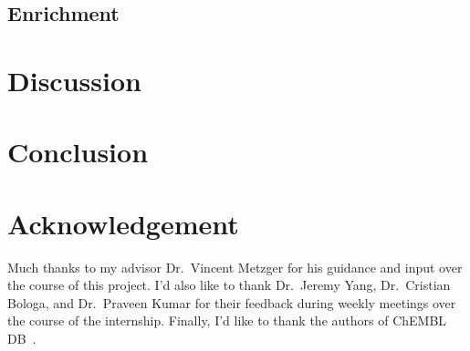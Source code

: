 \documentclass[11pt]{article}
\begin{document}
\begin{table}[!ht]
\centering
{}
\caption{Table showing comparisons of targets, ligands, and ligand similarity distributions per kinase group. Shown p-values are calculated (with Bonferroni correction) from a MWUT where the alternative hypothesis is that the similarity values within the group are stochastically greater than the distribution of all similarity values.}\label{results_table}
\end{table}



\subsection*{Enrichment}

\section*{Discussion}

\section*{Conclusion}


\section*{Acknowledgement}
Much thanks to my advisor Dr.~Vincent Metzger for his guidance and input over the course of this project. I'd also like to thank Dr.~Jeremy Yang, Dr.~Cristian Bologa, and Dr.~Praveen Kumar for their feedback during weekly meetings over the course of the internship. Finally, I'd like to thank the   authors of ChEMBL DB~\cite{chembl_db_2023}.


\end{document}
